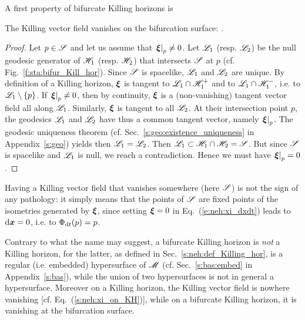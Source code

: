 A first property of bifurcate Killing horizons is
\begin{greybox}
The Killing vector field vanishes on the bifurcation surface:
\be \label{e:sta:xi_S_zero}
     .
\ee
\end{greybox}
\begin{proof}
Let $p\in \mathscr{S}$ and let us assume that $\left.\bm{\xi}\right| _p\not=0$.
Let $\mathscr{L}_1$ (resp. $\mathscr{L}_2$) be the null geodesic generator of $\mathscr{H}_1$
(resp. $\mathscr{H}_2$) that intersects $\mathscr{S}$ at $p$ (cf. Fig.~\ref{f:sta:bifur_Kill_hor}).
Since $\mathscr{S}$ is spacelike,
$\mathscr{L}_1$ and $\mathscr{L}_2$ are unique. By definition of a Killing horizon,
$\bm{\xi}$ is tangent to $\mathscr{L}_1\cap\mathscr{H}_1^+$ and to $\mathscr{L}_1\cap\mathscr{H}_1^-$,
i.e. to $\mathscr{L}_1\setminus\{p\}$.
If $\left.\bm{\xi}\right| _p \not=0$, then by continuity,
$\bm{\xi}$ is a (non-vanishing) tangent vector field all along $\mathscr{L}_1$.
Similarly, $\bm{\xi}$ is tangent to all $\mathscr{L}_2$.
At their intersection point $p$, the geodesics $\mathscr{L}_1$ and $\mathscr{L}_2$ have thus a common tangent
vector, namely $\left.\bm{\xi}\right| _p$.
The geodesic uniqueness theorem (cf. Sec.~\ref{s:geo:existence_uniqueness} in Appendix~\ref{s:geo})
yields then $\mathscr{L}_1 = \mathscr{L}_2$.
Then $\mathscr{L}_1 \subset \mathscr{H}_1 \cap \mathscr{H}_2 = \mathscr{S}$. But since $\mathscr{S}$ is spacelike and
$\mathscr{L}_1$ is null, we reach a contradiction. Hence we must have
$\left.\bm{\xi}\right| _p = 0$.
\end{proof}

\begin{remark}
\label{r:sta:zero_Killing}
Having a Killing vector field that vanishes somewhere (here $\mathscr{S}$) is not the sign
of any pathology: it simply means that the points of $\mathscr{S}$ are fixed points of
the isometries generated by $\bm{\xi}$, since
setting $\bm{\xi}=0$ in Eq.~(\ref{e:neh:xi_dxdt}) leads to $\mathrm{d}\bm{x}=0$, i.e.
to $\Phi_{\mathrm{d} t}(p) = p$.
\end{remark}

\begin{remark}
Contrary to what the name may suggest, a bifurcate Killing horizon is \emph{not}
a Killing horizon, for the latter, as defined in Sec.~\ref{s:neh:def_Killing_hor},
is a regular (i.e. embedded) hypersurface
of $\mathscr{M}$ (cf. Sec.~\ref{s:bas:embed} in Appendix~\ref{s:bas}), while
the union of two hypersurfaces is not in general a hypersurface. Moreover
on a Killing horizon, the Killing vector field is nowhere vanishing
[cf. Eq.~(\ref{s:neh:xi_on_KH})], while on
a bifurcate Killing horizon, it is vanishing at the bifurcation surface.
\end{remark}

